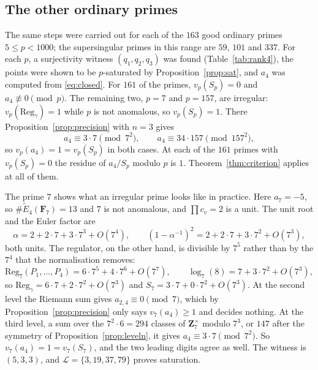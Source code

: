 \documentclass[11pt]{amsart}
\theoremstyle{definition}
\newcommand{\Z}{\mathbf{Z}}
\newcommand{\F}{\mathbf{F}}
\newcommand{\Reg}{\mathrm{Reg}}
\begin{document}
\subsection{The other ordinary primes}
The same steps were carried out for each of the $163$ good ordinary primes $5\le p<1000$; the supersingular primes in this range are $59$, $101$ and $337$. For each $p$, a surjectivity witness $(q_1,q_2,q_3)$ was found (Table~\ref{tab:rank4}), the points were shown to be $p$-saturated by Proposition~\ref{prop:sat}, and $a_4$ was computed from \eqref{eq:closed}. For $161$ of the primes, $v_p(S_p)=0$ and $a_4\not\equiv0\pmod p$. The remaining two, $p=7$ and $p=157$, are irregular: $v_p(\Reg_\gamma)=1$ while $p$ is not anomalous, so $v_p(S_p)=1$. There Proposition~\ref{prop:precision} with $n=3$ gives
\[
a_4\equiv3\cdot7\pmod{7^2},\qquad a_4\equiv34\cdot157\pmod{157^2},
\]
so $v_p(a_4)=1=v_p(S_p)$ in both cases. At each of the $161$ primes with $v_p(S_p)=0$ the residue of $a_4/S_p$ modulo $p$ is $1$. Theorem~\ref{thm:criterion} applies at all of them.

The prime $7$ shows what an irregular prime looks like in practice. Here $a_7=-5$, so $\#\tilde E_4(\F_7)=13$ and $7$ is not anomalous, and $\prod c_v=2$ is a unit. The unit root and the Euler factor are
\[
\alpha=2+2\cdot7+3\cdot7^3+O(7^4),\qquad(1-\alpha^{-1})^2=2+2\cdot7+3\cdot7^2+O(7^3),
\]
both units. The regulator, on the other hand, is divisible by $7^5$ rather than by the $7^4$ that the normalisation removes:
\[
\Reg_7(P_1,\dots,P_4)=6\cdot7^5+4\cdot7^6+O(7^7),\qquad\log_7(8)=7+3\cdot7^2+O(7^3),
\]
so $\Reg_\gamma=6\cdot7+2\cdot7^2+O(7^3)$ and $S_7=3\cdot7+0\cdot7^2+O(7^3)$. At the second level the Riemann sum gives $a_{2,4}\equiv0\pmod7$, which by Proposition~\ref{prop:precision} only says $v_7(a_4)\ge1$ and decides nothing. At the third level, a sum over the $7^2\cdot6=294$ classes of $\Z_7^\times$ modulo $7^3$, or $147$ after the symmetry of Proposition~\ref{prop:leveln}, it gives $a_4\equiv3\cdot7\pmod{7^2}$. So $v_7(a_4)=1=v_7(S_7)$, and the two leading digits agree as well. The witness is $(5,3,3)$, and $\mathcal L=\{3,19,37,79\}$ proves saturation.
\end{document}
